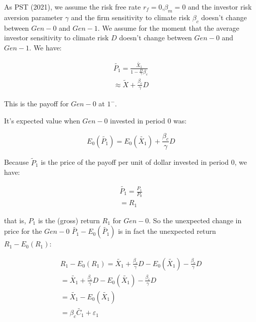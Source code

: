 As PST (2021), we assume the 
risk free rate $r_f = 0$,$\beta_m = 0$ and the investor 
risk aversion parameter $\gamma$ and the 
firm sensitivity to climate risk $\beta_{c}$
doesn't change between $Gen-0$ and $Gen-1$.
We assume for the moment that the average 
investor sensitivity to climate risk $D$ 
doesn't change between $Gen-0$ and $Gen-1$.
We have:

\begin{equation}
    \begin{aligned}
    \tilde{P_1} = \frac{\tilde{X_1}}{1 - \frac{D}{\gamma} \beta_{c}} \\
    \approx \tilde{X} + \frac{\beta_{c}}{\gamma}D
    \end{aligned}
\end{equation}


This is the payoff for $Gen-0$ at $1^{-}$.

It's expected value when $Gen-0$ invested in period 0 was:

\begin{equation}
    E_0(\tilde{P_1}) = E_0(\tilde{X_1}) + \frac{\beta_{c}}{\gamma}D
\end{equation}

Because $\tilde{P}_1$ is the price of the payoff 
per unit of dollar invested in period 0, we have:

\begin{equation}
    \begin{aligned}
    \tilde{P_1} = \frac{P_1}{P_0} \\
    = R_1
    \end{aligned}
\end{equation}

that is, $P_1$ is the (gross) return
$R_1$ for $Gen-0$.
So the unexpected change in price 
for the $Gen-0$ $\tilde{P_1} - E_0(\tilde{P_1})$ is in fact
the unexpected return $R_1 - E_0(R_1)$:

\begin{equation}
    \begin{aligned}
    R_1 - E_0(R_1) = \tilde{X_1} + \frac{\beta_{c}}{\gamma}D - E_0(\tilde{X_1}) - \frac{\beta_{c}}{\gamma}D \\
    = \tilde{X_1} + \frac{\beta_{c}}{\gamma}D - E_0(\tilde{X_1}) - \frac{\beta_{c}}{\gamma}D \\
    = \tilde{X_1} - E_0(\tilde{X_1}) \\
    = \beta_{c} \tilde{C_1} + \varepsilon_1
    \end{aligned}
\end{equation}

